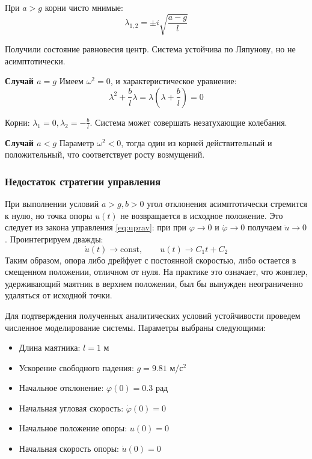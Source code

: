 \documentclass[a4paper, 12pt]{article}
\begin{document}
При $a>g$ корни чисто мнимые:
\begin{equation}
\lambda_{1,2} = \pm i\sqrt{\frac{a - g}{l}}
\end{equation}

Получили состояние равновесия центр. Система устойчива по Ляпунову, но не асимптотически.

\textbf{Случай $a=g$}
Имеем $\omega^2 = 0$, и характеристическое уравнение:
\begin{equation}
\lambda^2 + \frac{b}{l}\lambda = \lambda\left(\lambda + \frac{b}{l}\right) = 0
\end{equation}

Корни: $\lambda_1 = 0, \lambda_2=-\frac{b}{l}$. Система может совершать незатухающие колебания.

\textbf{Случай $a<g$}
Параметр $\omega^2 < 0$, тогда один из корней действительный и положительный, что соответствует росту возмущений.

\subsubsection{Недостаток стратегии управления}
При выполнении условий $a>g, b>0$ угол отклонения асимптотически стремится к нулю, но точка опоры $u(t)$ не возвращается в исходное положение. Это следует из закона управления \eqref{eq:uprav}: при при $\varphi \to 0$ и $\dot{\varphi} \to 0$ получаем $\ddot{u} \to 0$. Проинтегрируем дважды:
\begin{equation}
\dot{u}(t) \to \text{const}, \qquad u(t) \to C_1 t + C_2
\end{equation}
Таким образом, опора либо дрейфует с постоянной скоростью, либо остается в смещенном положении, отличном от нуля. На практике это означает, что жонглер, удерживающий маятник в верхнем положении, был бы вынужден неограниченно удаляться от исходной точки.

Для подтверждения полученных аналитических условий устойчивости проведем численное моделирование системы. Параметры выбраны следующими:
\begin{itemize}
    \item Длина маятника: $l = 1$ м
    \item Ускорение свободного падения: $g = 9.81$ м/с$^2$
    \item Начальное отклонение: $\varphi(0) = 0.3$ рад
    \item Начальная угловая скорость: $\dot{\varphi}(0) = 0$
    \item Начальное положение опоры: $u(0) = 0$
    \item Начальная скорость опоры: $\dot{u}(0) = 0$
\end{itemize}
\end{document}
